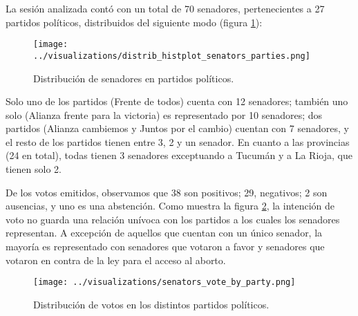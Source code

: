 La sesión analizada contó con un total de 70 senadores,
pertenecientes a 27 partidos políticos, distribuidos del
siguiente modo (figura \ref{fig-distrib-senators}):

\begin{figure}[h!]
\centering
\texttt{[image: ../visualizations/distrib\_histplot\_senators\_parties.png]}
\caption{Distribución de senadores en partidos políticos.}
\label{fig-distrib-senators}
\end{figure}

Solo uno de los partidos (Frente de todos) cuenta con 12
senadores; también uno solo (Alianza frente para la victoria) es
representado por 10 senadores; dos partidos (Alianza cambiemos y
Juntos por el cambio) cuentan con 7 senadores, y el resto de los
partidos tienen entre 3, 2 y un senador.
En cuanto a las provincias (24 en total), todas tienen 3 senadores
exceptuando a Tucumán y a La Rioja, que tienen solo 2.

De los votos emitidos, observamos que 38 son positivos; 29, negativos;
2 son ausencias, y uno es una abstención.
Como muestra la figura \ref{fig-distrib-vote}, la intención
de voto no guarda una relación unívoca con los partidos a los cuales los
senadores representan. A excepción de aquellos que cuentan con un único
senador, la mayoría es representado con senadores que votaron a favor y senadores
que votaron en contra de la ley para el acceso al aborto.

\begin{figure}[h!]
\centering
\texttt{[image: ../visualizations/senators\_vote\_by\_party.png]}
\caption{Distribución de votos en los distintos partidos políticos.}
\label{fig-distrib-vote}
\end{figure}


